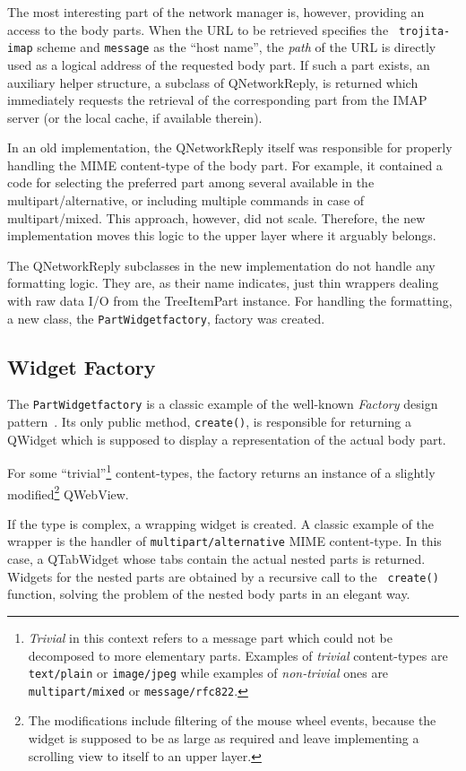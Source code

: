 \documentclass[12pt,notitlepage]{report}
\begin{document}
The most interesting part of the network manager is, however, providing an
access to the body parts.  When the URL to be retrieved specifies the {\tt
trojita-imap} scheme and {\tt message} as the ``host name'', the {\em path} of
the URL is directly used as a logical address of the requested body part.  If
such a part exists, an auxiliary helper structure, a subclass of QNetworkReply,
is returned which immediately requests the retrieval of the corresponding part
from the IMAP server (or the local cache, if available therein).

In an old implementation, the QNetworkReply itself was responsible for properly
handling the MIME content-type of the body part.  For example, it contained a
code for selecting the preferred part among several available in the
multipart/alternative, or including multiple commands in case of
multipart/mixed.  This approach, however, did not scale.  Therefore, the new
implementation moves this logic to the upper layer where it arguably belongs.

The QNetworkReply subclasses in the new implementation do not handle any
formatting logic.  They are, as their name indicates, just thin wrappers dealing
with raw data I/O from the TreeItemPart instance.  For handling the formatting,
a new class, the {\tt PartWidgetfactory}, factory was created.

\subsection{Widget Factory}

The {\tt PartWidgetfactory} is a classic example of the well-known {\em Factory}
design pattern~\cite{GoF}.  Its only public method, {\tt create()}, is responsible for
returning a QWidget which is supposed to display a representation of the actual
body part.

For some ``trivial''\footnote{{\em Trivial} in this context refers to a message
part which could not be decomposed to more elementary parts.  Examples of {\em
trivial} content-types are {\tt text/plain} or {\tt image/jpeg} while examples
of {\em non-trivial} ones are {\tt multipart/mixed} or {\tt message/rfc822}.}
content-types, the factory returns an instance of a slightly
modified\footnote{The modifications include filtering of the mouse wheel events,
because the widget is supposed to be as large as required and leave implementing
a scrolling view to itself to an upper layer.} QWebView.

If the type is complex, a wrapping widget is created.  A classic example of the
wrapper is the handler of {\tt multipart/alternative} MIME content-type.  In
this case, a QTabWidget whose tabs contain the actual nested parts is returned.
Widgets for the nested parts are obtained by a recursive call to the {\tt
create()} function, solving the problem of the nested body parts in an elegant
way.
\end{document}

